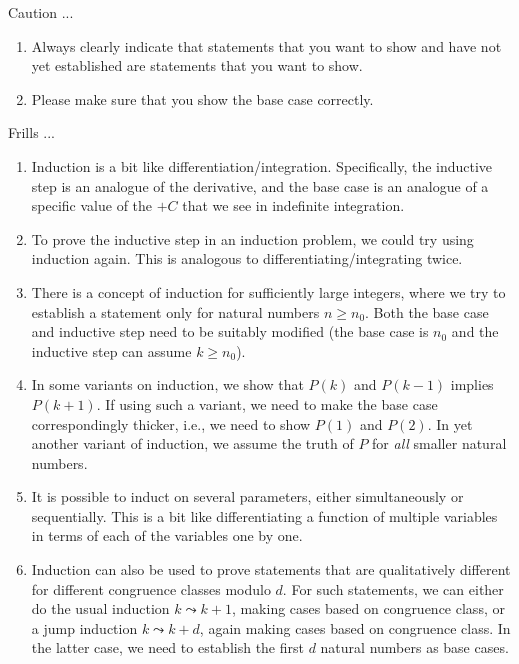 \documentclass[10pt]{amsart}
\begin{document}
Caution ...

\begin{enumerate}
\item Always clearly indicate that statements that you want to show
  and have not yet established are statements that you want to show.
\item Please make sure that you show the base case correctly.
\end{enumerate} 

Frills ...

\begin{enumerate}
\item Induction is a bit like
  differentiation/integration. Specifically, the inductive step is an
  analogue of the derivative, and the base case is an analogue of a
  specific value of the $+C$ that we see in indefinite integration.
\item To prove the inductive step in an induction problem, we could
  try using induction again. This is analogous to
  differentiating/integrating twice.
\item There is a concept of induction for sufficiently large integers,
  where we try to establish a statement only for natural numbers $n
  \ge n_0$. Both the base case and inductive step need to be suitably
  modified (the base case is $n_0$ and the inductive step can assume
  $k \ge n_0$).
\item In some variants on induction, we show that $P(k)$ and $P(k-1)$
  implies $P(k+1)$. If using such a variant, we need to make the base
  case correspondingly thicker, i.e., we need to show $P(1)$ and
  $P(2)$. In yet another variant of induction, we assume the truth of
  $P$ for {\em all} smaller natural numbers.
\item It is possible to induct on several parameters, either
  simultaneously or sequentially. This is a bit like differentiating a
  function of multiple variables in terms of each of the variables one
  by one.
\item Induction can also be used to prove statements that are
  qualitatively different for different congruence classes modulo
  $d$. For such statements, we can either do the usual induction $k
  \leadsto k + 1$, making cases based on congruence class, or a jump
  induction $k \leadsto k + d$, again making cases based on congruence
  class. In the latter case, we need to establish the first $d$
  natural numbers as base cases.
\end{enumerate}
\end{document}

